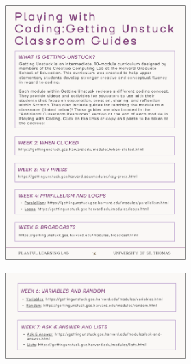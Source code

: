 \documentclass[11.5pt]{sig-alternate} %
\begin{document}
\begin{large}
\begin{figure}[hb]
    \centering
    \includegraphics[width=0.62\textwidth]{images/appendix2.png}
    \label{Appendix 2a}
\end{figure}

\begin{figure}[hb]
    \centering
    \includegraphics[width=0.62\textwidth]{images/appendix2_b.png}
    \label{Appendix 2b}
\end{figure}

\end{large}
\end{document}
